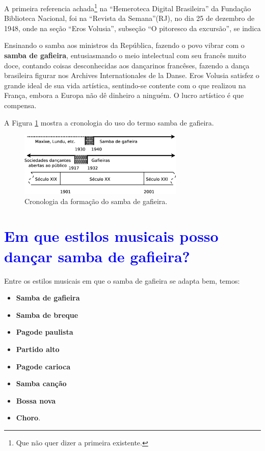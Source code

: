A primeira referencia achada\footnote{Que não quer dizer a primeira existente.} 
na ``Hemeroteca Digital Brasileira'' da Fundação Biblioteca Nacional,
foi na ``Revista da Semana''(RJ), no dia 25 de dezembro de 1948,
onde na seção ``Eros Volusia'', subseção ``O pitoresco da excursão'', se indica \cite[pp. 48]{sambagafieirarefbn}
\begin{citando}
Ensinando o samba aos ministros da República, 
fazendo o povo vibrar com o \textbf{samba de gafieira}, entusiasmando
o meio intelectual com seu francês muito doce,
contando coisas desconhecidas aos dançarinos francêses,
fazendo a dança brasileira figurar nos Archives Internationales de la Danse.
Eros Volusia satisfez o grande ideal de sua vida artística, sentindo-se contente
com o que realizou na França, embora a Europa não dê dinheiro a ninguém.
O lucro artístico é que compensa.
\end{citando}


A Figura \ref{fig:sambagafieiracrono} mostra a cronologia do uso do termo samba de gafieira. 

\begin{figure}[h]
  \centering
    \includegraphics[width=0.7\textwidth]{chapters/cap-historia-sambagafieira/gafieira-crono.eps}
  \caption{ Cronologia da formação do samba de gafieira.}
\label{fig:sambagafieiracrono}
\end{figure}

\section{\textcolor{blue}{Em que estilos musicais posso dançar samba de gafieira?}}
\label{subsec:gafieiradancaestilos}

Entre os estilos musicais em que o samba de gafieira se adapta bem, temos:
\begin{itemize}
\item \textbf{Samba de gafieira}
\item \textbf{Samba de breque}
\item \textbf{Pagode paulista}
\item \textbf{Partido alto}
\item \textbf{Pagode carioca}
\item \textbf{Samba canção}
\item \textbf{Bossa nova}
\item \textbf{Choro}.
\end{itemize}

